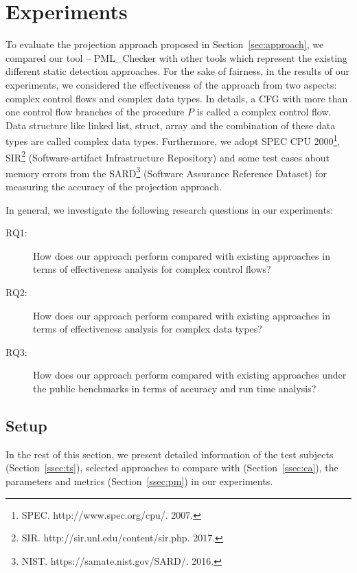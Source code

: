 \section{Experiments}\label{sec:experiments}

To evaluate the projection approach proposed in Section~\ref{sec:approach}, 
we compared our tool -- PML\_Checker with other tools which represent the existing different static detection approaches. For the sake of fairness, in the results of our experiments, we considered the effectiveness of the approach from two aspects: complex control flows and complex data types. In details, a CFG with more than one control flow branches of the procedure $P$ is called a complex control flow. Data structure like linked list, struct, array and the combination of these data types are called complex data types. Furthermore, we adopt SPEC CPU 2000\footnote{SPEC. http://www.spec.org/cpu/. 2007.}, SIR\footnote{SIR. http://sir.unl.edu/content/sir.php. 2017.} (Software-artifact Infrastructure Repository) and some test cases about memory errors from the SARD\footnote{NIST. https://samate.nist.gov/SARD/. 2016.} (Software Assurance Reference Dataset) for measuring the accuracy of the projection approach.

In general, we investigate the following research questions in our experiments:
\begin{description}
\item[RQ1:] How does our approach perform compared with existing approaches in terms of effectiveness analysis for complex control flows? 
\item[RQ2:] How does our approach perform compared with existing approaches in terms of effectiveness analysis for complex data types? 
\item[RQ3:] How does our approach perform compared with existing approaches under the public benchmarks in terms of accuracy and run time analysis? 
\end{description}

\subsection{Setup}
In the rest of this section, we present detailed information of the test subjects (Section~\ref{ssec:ts}), selected approaches to compare with (Section~\ref{ssec:ca}), the parameters and metrics (Section~\ref{ssec:pm}) in our experiments.

